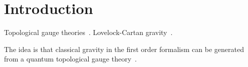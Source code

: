 \documentclass[../main.tex]{subfiles}
\begin{document}
\section{Introduction}\label{sec:introduction}

Topological gauge theories~\cite{brandhuber1994a,sadovski2017c,sadovski2018a,sadovski2018b,sadovski2020}. Lovelock-Cartan gravity~\cite{mardones1991a,sadovski2017a}.

The idea is that classical gravity in the first order formalism can be generated from a quantum topological gauge theory~\cite{sako1997a,mielke2011a}.
\end{document}
